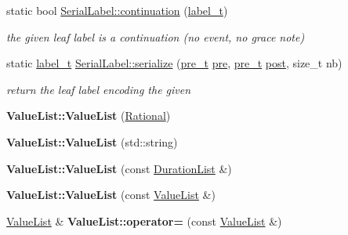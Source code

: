 \begin{DoxyCompactItemize}
static bool \mbox{\hyperlink{group__output_gaaf4c88a23710366cbe35081a0967b536}{Serial\+Label\+::continuation}} (\mbox{\hyperlink{group__output_ga22fde970e635fcf63962743b2d5c441d}{label\+\_\+t}})
\begin{DoxyCompactList}\small\item\em the given leaf label is a continuation (no event, no grace note) \end{DoxyCompactList}\item 
static \mbox{\hyperlink{group__output_ga22fde970e635fcf63962743b2d5c441d}{label\+\_\+t}} \mbox{\hyperlink{group__output_ga69973921641222cb765112c70df25318}{Serial\+Label\+::serialize}} (\mbox{\hyperlink{group__general_ga092fe8b972dfa977c2a0886720a7731e}{pre\+\_\+t}} \mbox{\hyperlink{group__output_ga3d92180f844d00eaf0bbd46e10f022e4}{pre}}, \mbox{\hyperlink{group__general_ga092fe8b972dfa977c2a0886720a7731e}{pre\+\_\+t}} \mbox{\hyperlink{group__output_ga7c5289addb03e9bf54467e2d84c7ef79}{post}}, size\+\_\+t nb)
\begin{DoxyCompactList}\small\item\em return the leaf label encoding the given \end{DoxyCompactList}\item 
\mbox{\label{group__output_ga187d1dfe0e942d18f1e2c3150e9aa185}} 
{\bfseries Value\+List\+::\+Value\+List} (\mbox{\hyperlink{classRational}{Rational}})
\item 
\mbox{\label{group__output_gad518d3f6ddf7fb7b74275eef20205893}} 
{\bfseries Value\+List\+::\+Value\+List} (std\+::string)
\item 
\mbox{\label{group__output_gaec135d71a5c51579bec52c805c0b3ded}} 
{\bfseries Value\+List\+::\+Value\+List} (const \mbox{\hyperlink{classDurationList}{Duration\+List}} \&)
\item 
\mbox{\label{group__output_gabd7a0aa8113f72c13205c0702eb269ff}} 
{\bfseries Value\+List\+::\+Value\+List} (const \mbox{\hyperlink{classValueList}{Value\+List}} \&)
\item 
\mbox{\label{group__output_gab09ac2a5e83e806431634ddd87f596fc}} 
\mbox{\hyperlink{classValueList}{Value\+List}} \& {\bfseries Value\+List\+::operator=} (const \mbox{\hyperlink{classValueList}{Value\+List}} \&)
\item 

\end{DoxyCompactItemize}
